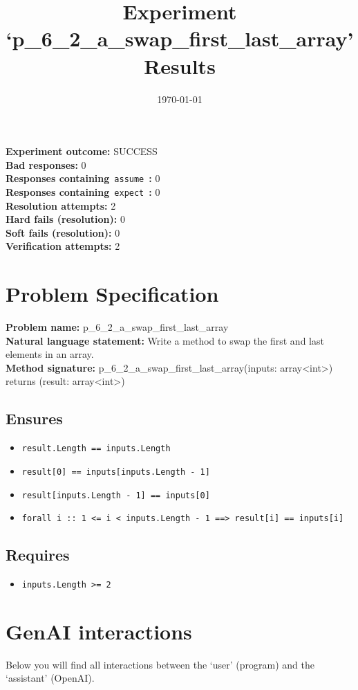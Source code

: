 \documentclass{article}
\begin{document}
\title{Experiment `p\_6\_2\_a\_swap\_first\_last\_array' Results}
\author{\today}
\date{}
\maketitle
\textbf{Experiment outcome: }SUCCESS
\\\textbf{Bad responses: }0
\\\textbf{Responses containing}~\texttt{assume}~\textbf{: }0
\\\textbf{Responses containing}~\texttt{expect}~\textbf{: }0
\\\textbf{Resolution attempts: }2
\\\textbf{Hard fails (resolution): }0
\\\textbf{Soft fails (resolution): }0
\\\textbf{Verification attempts: }2
\section*{Problem Specification}
\textbf{Problem name: }p\_6\_2\_a\_swap\_first\_last\_array
\\\textbf{Natural language statement: }Write a method to swap the first and last elements in an array.
\\\textbf{Method signature: }p\_6\_2\_a\_swap\_first\_last\_array(inputs: array<int>) returns (result: array<int>)
\subsection*{Ensures}
\begin{itemize}
\item \texttt{result.Length == inputs.Length}
\item \texttt{result[0] == inputs[inputs.Length - 1]}
\item \texttt{result[inputs.Length - 1] == inputs[0]}
\item \texttt{forall i :: 1 <= i < inputs.Length - 1 ==> result[i] == inputs[i]}
\end{itemize}
\subsection*{Requires}
\begin{itemize}
\item \texttt{inputs.Length >= 2}
\end{itemize}
\clearpage
\section*{GenAI interactions}
Below you will find all interactions between the `user' (program) and the `assistant' (OpenAI).
\end{document}
